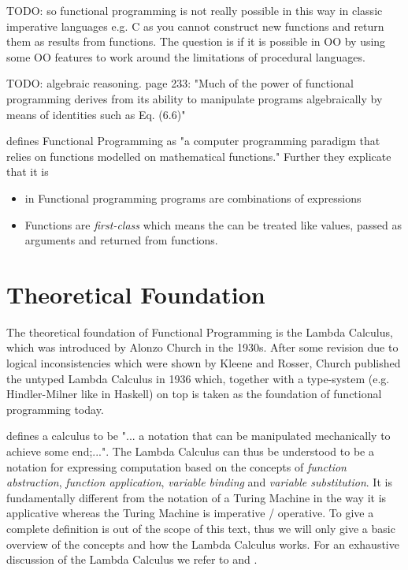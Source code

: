 TODO: so functional programming is not really possible in this way in classic imperative languages e.g. C as you cannot construct new functions and return them as results from functions. The question is if it is possible in OO by using some OO features to work around the limitations of procedural languages.

TODO: algebraic reasoning. \cite{maclennan_functional_1990} page 233: "Much of the power of functional programming derives from its ability to manipulate programs algebraically by means of identities such as Eq. (6.6)"

\cite{allen_haskell_2016} defines Functional Programming as "a computer programming paradigm that relies on functions modelled on mathematical functions." Further they explicate that it is 
\begin{itemize}
	\item in Functional programming programs are combinations of expressions
	\item Functions are \textit{first-class} which means the can be treated like values, passed as arguments and returned from functions.
\end{itemize}

\section{Theoretical Foundation}
The theoretical foundation of Functional Programming is the Lambda Calculus, which was introduced by Alonzo Church in the 1930s. After some revision due to logical inconsistencies which were shown by Kleene and Rosser, Church published the untyped Lambda Calculus in 1936 which, together with a type-system (e.g. Hindler-Milner like in Haskell) on top is taken as the foundation of functional programming today.

\cite{maclennan_functional_1990} defines a calculus to be "... a notation that can be manipulated mechanically to achieve some end;...". The Lambda Calculus can thus be understood to be a notation for expressing computation based on the concepts of \textit{function abstraction}, \textit{function application}, \textit{variable binding} and \textit{variable substitution}. It is fundamentally different from the notation of a Turing Machine in the way it is applicative whereas the Turing Machine is imperative / operative. To give a complete definition is out of the scope of this text, thus we will only give a basic overview of the concepts and how the Lambda Calculus works. For an exhaustive discussion of the Lambda Calculus we refer to \cite{maclennan_functional_1990} and \cite{barendregt_lambda_1984}.

